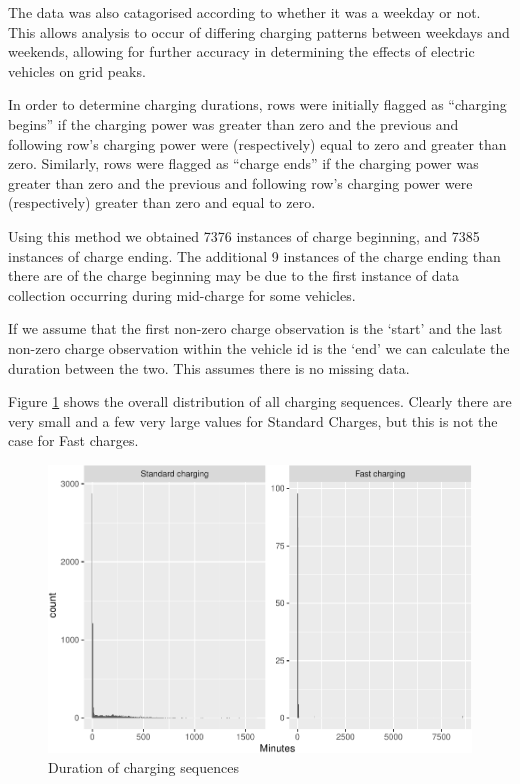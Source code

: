 \documentclass[]{article}
\begin{document}
The data was also catagorised according to whether it was a weekday or
not. This allows analysis to occur of differing charging patterns
between weekdays and weekends, allowing for further accuracy in
determining the effects of electric vehicles on grid peaks.

In order to determine charging durations, rows were initially flagged as
``charging begins'' if the charging power was greater than zero and the
previous and following row's charging power were (respectively) equal to
zero and greater than zero. Similarly, rows were flagged as ``charge
ends'' if the charging power was greater than zero and the previous and
following row's charging power were (respectively) greater than zero and
equal to zero.

Using this method we obtained 7376 instances of charge beginning, and
7385 instances of charge ending. The additional 9 instances of the
charge ending than there are of the charge beginning may be due to the
first instance of data collection occurring during mid-charge for some
vehicles.

If we assume that the first non-zero charge observation is the `start'
and the last non-zero charge observation within the vehicle id is the
`end' we can calculate the duration between the two. This assumes there
is no missing data.

Figure \ref{fig:durationHist} shows the overall distribution of all
charging sequences. Clearly there are very small and a few very large
values for Standard Charges, but this is not the case for Fast charges.

\begin{figure}
\centering
\includegraphics{EVBB_report_files/figure-latex/durationHist-1.pdf}
\caption{\label{fig:durationHist}Duration of charging sequences}
\end{figure}
\end{document}
